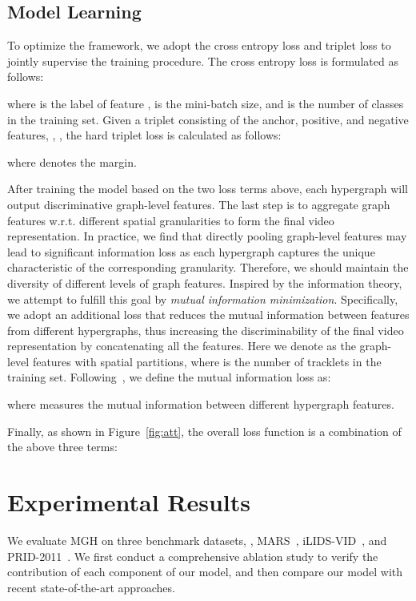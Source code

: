 \documentclass[10pt,twocolumn,letterpaper]{article}
\begin{document}
\subsection{Model Learning}
To optimize the framework, we adopt the cross entropy loss and triplet loss to jointly supervise the training procedure. The cross entropy loss is formulated as follows:

where  is the label of feature ,  is the mini-batch size, and  is the number of classes in the training set.
Given a triplet consisting of the anchor, positive, and negative features, \ie, , the hard triplet loss is calculated as follows:

where  denotes the margin. 

After training the model based on the two loss terms above, each hypergraph will output discriminative graph-level features. The last step is to aggregate graph features w.r.t. different spatial granularities to form the final video representation. In practice, we find that directly pooling graph-level features may lead to significant information loss as each hypergraph captures the unique characteristic of the corresponding granularity. Therefore, we should maintain the diversity of different levels of graph features. Inspired by the information theory, we attempt to fulfill this goal by \emph{mutual information minimization}. Specifically, we adopt an additional loss that reduces the mutual information between features from different hypergraphs, thus increasing the discriminability of the final video representation by concatenating all the features. Here we denote  as the graph-level features with  spatial partitions, where  is the number of tracklets in the training set. Following~\cite{DBLP:conf/iclr/HjelmFLGBTB19}, we define the mutual information loss as:

where  measures the mutual information between different hypergraph features. 

Finally, as shown in Figure~\ref{fig:att}, the overall loss function is a combination of the above three terms:



\section{Experimental Results}
We evaluate MGH on three benchmark datasets, \ie, MARS~\cite{DBLP:conf/eccv/ZhengBSWSWT16}, iLIDS-VID~\cite{DBLP:conf/eccv/WangGZW14}, and PRID-2011~\cite{DBLP:conf/scia/HirzerBRB11}. We first conduct a comprehensive ablation study to verify the contribution of each component of our model, and then compare our model with recent state-of-the-art approaches.
\end{document}
